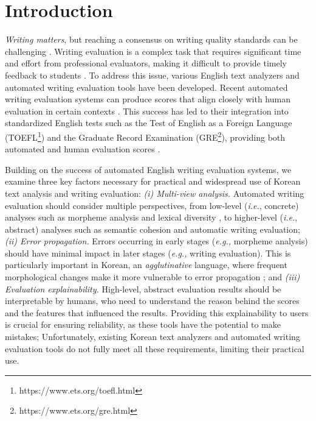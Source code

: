 \section{Introduction}
\label{sec:01_introduction}

\textit{Writing matters}, but reaching a consensus on writing quality standards can be challenging \cite{deane2022importance}. 
Writing evaluation is a complex task that requires significant time and effort from professional evaluators, making it difficult to provide timely feedback to students \cite{finn2024memory}.
To address this issue, various English text analyzers \cite{graesser2004cohmetrix, mcnamara2010linguistic, rei2016sentence, crossley2019taaco} and automated writing evaluation tools \cite{wang2022aessota, jeon2021countering, uto2020neural} have been developed. 
Recent automated writing evaluation systems can produce scores that align closely with human evaluation in certain contexts \cite{beigman2020automated}. 
This success has led to their integration into standardized English tests such as the Test of English as a Foreign Language (TOEFL\footnote{https://www.ets.org/toefl.html}) and the Graduate Record Examination (GRE\footnote{https://www.ets.org/gre.html}), providing both automated and human evaluation scores \cite{beigman2020automated, ramineni2012gre}.

Building on the success of automated English writing evaluation systems, we examine three key factors necessary for practical and widespread use of Korean text analysis and writing evaluation: 
\textit{\textsf{(i) Multi-view analysis.}} Automated writing evaluation should consider multiple perspectives, from low-level (\textit{i.e.}, concrete) analyses such as morpheme analysis and lexical diversity%
, to higher-level (\textit{i.e.}, abstract) analyses such as semantic cohesion and automatic writing evaluation; 
\textit{\textsf{(ii) Error propagation.}} Errors occurring in early stages (\textit{e.g.,} morpheme analysis) should have minimal impact in later stages (\textit{e.g.,} writing evaluation). This is particularly important in Korean, an \textit{agglutinative} language, where frequent morphological changes make it more vulnerable to error propagation \cite{matteson2018rich};
and \textit{\textsf{(iii) Evaluation explainability.}} High-level, abstract evaluation results should be interpretable by humans, who need to understand the reason behind the scores and the features that influenced the results. 
Providing this explainability to users is crucial for ensuring reliability, as these tools have the potential to make mistakes; Unfortunately, existing Korean text analyzers \cite{ryu2019koranlysis, lee2024exploring, kim2024korcat} and automated writing evaluation tools \cite{lee2022argument, lee2023pasta} do not fully meet all these requirements, limiting their practical use.

